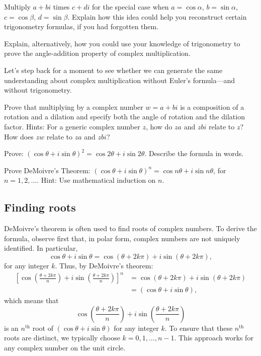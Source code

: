 \documentclass[space,nooutcomes]{ximera}
\begin{document}
\begin{problem}
Multiply $a + bi$ times $c + di$ for the special case when $a=\cos\alpha$, $b=\sin\alpha$, 
$c=\cos\beta$, $d=\sin\beta$.  Explain how this idea could help you reconstruct certain trigonometry formulas, if you had forgotten them.  

Explain, alternatively, how you could use your knowledge of trigonometry to prove the angle-addition property of complex multiplication.  
\end{problem}

%
%
Let's step back for a moment to see whether we can generate the same understanding about complex multiplication without Euler's formula---and without trigonometry.  
\begin{problem}
Prove that multiplying by a complex number $w = a + bi$ is a composition of a rotation and a dilation and specify both the angle of rotation and the dilation factor.  Hints: For a generic complex number $z$, how do $za$ and $zbi$ relate to $z$?  How does $zw$ relate to $za$ and $zbi$?  
\end{problem}

\begin{problem}
Prove:  $(\cos\theta + i\sin\theta)^2=\cos 2\theta + i\sin 2\theta$.  Describe the formula in words.    
\end{problem}

\begin{problem}
Prove DeMoivre's Theorem:  $(\cos\theta + i\sin\theta)^n=\cos n\theta + i\sin n\theta$, for $n=1, 2, \dots$.  Hint: Use mathematical induction on $n$. 
\end{problem}

\subsection{Finding roots}
DeMoivre's theorem is often used to find roots of complex numbers.  
To derive the formula, observe first that, in polar form, complex numbers are not uniquely identified.  In particular, 
\[
\cos\theta + i\sin\theta =\cos (\theta+2k\pi) + i\sin (\theta+2k\pi), 
\]
for any integer $k$. Thus, by DeMoivre's theorem:  
\begin{align*}
\left[ \cos \left(\frac{\theta+2k\pi}{n}\right) 
+ i\sin \left(\frac{\theta+2k\pi}{n}\right) \right]^n 
&= \cos (\theta+2k\pi) + i\sin (\theta+2k\pi) \\
&= (\cos\theta + i\sin\theta), 
\end{align*}
which means that 
\[
\cos \left(\frac{\theta+2k\pi}{n}\right) 
+ i\sin \left(\frac{\theta+2k\pi}{n}\right)
\]
is an $n^\text{th}$ root of $(\cos\theta + i\sin\theta)$ for any integer $k$.  To ensure that these $n^\text{th}$ roots are distinct, we typically choose $k= 0, 1, \dots, n-1$.  This approach works for any complex number on the unit circle.  
\end{document}
